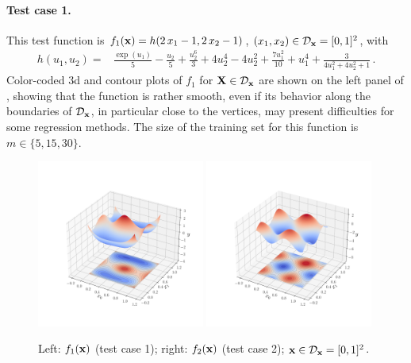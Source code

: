 \paragraph{Test case 1.}

This test function is $f_1({\bf x}) = h(2\,x_1 - 1, 2\,x_2 - 1)$, $(x_1,x_2) \in \mathcal{D}_{\bf x}=[0,1]^2$, with
\begin{align*}
  h(u_1, u_2) =& \frac{\exp(u_1)}{5} - \frac{u_2}{5} + \frac{u_2^6}{3} + 4 u_2^4 - 4 u_2^2 + \frac{7u_1^2}{10} + u_1^4 + \frac{3}{4 u_1^2 + 4 u_2^2 + 1}\,. %
\end{align*}
Color-coded 3d and contour plots of $f_1$ for ${\bf X}\in\mathcal{D}_{\bf x}$ are shown on the left panel of , showing that 
the function is rather smooth, even if its behavior along the boundaries of $\mathcal{D}_{\bf x}$, in particular close to the vertices, may present difficulties for some regression methods. 
The size of the training set for this function is $m\in\{5, 15, 30\}$.


\begin{figure}
  \centering
  \includegraphics[width=0.49\textwidth]{./part2/figures/SIS/irregular_function3D.pdf}
    \includegraphics[width=0.49\textwidth]{./part2/figures/SIS/cosin2_function3D.pdf}
  \caption{Left: $f_1({\bf x})$ (test case 1); right: $f_2({\bf x})$ (test case 2); ${\bf x}\in\mathcal{D}_{\bf x}=[0,1]^2$.} 
  \label{fig:f1&f2}
\end{figure}


